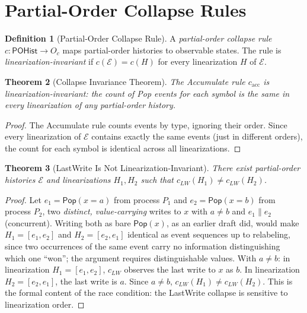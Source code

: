 \documentclass[12pt, a4paper, openany]{book}
\theoremstyle{plain}
\newtheorem{theorem}{Theorem}[chapter]
\theoremstyle{definition}
\newtheorem{definition}[theorem]{Definition}
\theoremstyle{remark}
\newcommand{\Pop}{\mathsf{Pop}}
\begin{document}
\section{Partial-Order Collapse Rules}

\begin{definition}[Partial-Order Collapse Rule]
A \emph{partial-order collapse rule} $c : \mathsf{POHist} \to O_c$ maps
partial-order histories to observable states. The rule is
\emph{linearization-invariant} if $c(\mathcal{E}) = c(H)$ for every
linearization $H$ of $\mathcal{E}$.
\end{definition}

\begin{theorem}[Collapse Invariance Theorem]
The Accumulate rule $c_{\mathrm{acc}}$ is linearization-invariant: the count
of Pop events for each symbol is the same in every linearization of any
partial-order history.
\end{theorem}

\begin{proof}
The Accumulate rule counts events by type, ignoring their order. Since every
linearization of $\mathcal{E}$ contains exactly the same events (just in
different orders), the count for each symbol is identical across all
linearizations.
\end{proof}

\begin{theorem}[LastWrite Is Not Linearization-Invariant]
There exist partial-order histories $\mathcal{E}$ and linearizations $H_1, H_2$
such that $c_{LW}(H_1) \neq c_{LW}(H_2)$.
\end{theorem}

\begin{proof}
Let $e_1 = \Pop(x{=}a)$ from process $P_1$ and $e_2 = \Pop(x{=}b)$ from process
$P_2$, two \emph{distinct, value-carrying} writes to $x$ with $a \neq b$ and
$e_1 \parallel e_2$ (concurrent). Writing both as bare $\Pop(x)$, as an earlier
draft did, would make $H_1 = [e_1, e_2]$ and $H_2 = [e_2, e_1]$ identical as
event sequences up to relabeling, since two occurrences of the same event carry
no information distinguishing which one ``won''; the argument requires
distinguishable values. With $a \neq b$: in linearization $H_1 = [e_1, e_2]$,
$c_{LW}$ observes the last write to $x$ as $b$. In linearization
$H_2 = [e_2, e_1]$, the last write is $a$. Since $a \neq b$,
$c_{LW}(H_1) \neq c_{LW}(H_2)$. This is the formal content of the race
condition: the LastWrite collapse is sensitive to linearization order.
\end{proof}
\end{document}
